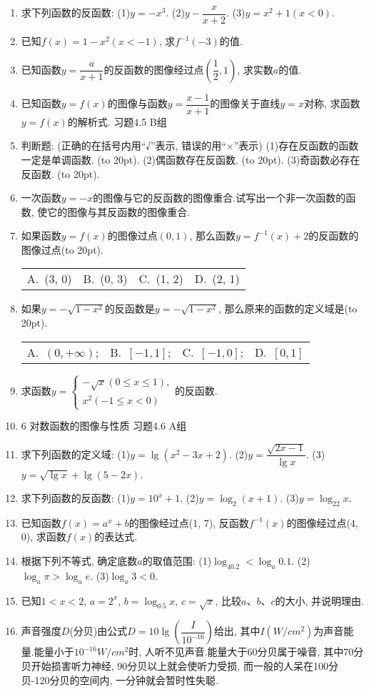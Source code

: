 \documentclass[10pt,a4paper]{article}
\newcommand{\bracket}[1]{(\hbox to #1pt{})}
\newcommand{\fourch}[4]{\par\begin{tabular}{p{.23\textwidth}p{.23\textwidth}p{.23\textwidth}p{.23\textwidth}}
A.~#1 &B.~#2& C.~#3& D.~#4
\end{tabular}}
\begin{document}
\begin{enumerate}[1.]
\item 求下列函数的反函数:
(1)$y=-x^3$.						(2)$y-\dfrac x{x+2}$.
(3)$y=x^2+1(x<0)$.
\item 已知$f(x)=1-x^2(x<-1)$, 求$f^{-1}(-3)$的值.
\item 已知函数$y=\dfrac a{x+1}$的反函数的图像经过点$(\dfrac 12,1)$, 求实数$a$的值.
\item 已知函数$y=f(x)$的图像与函数$y=\dfrac{x-1}{x+1}$的图像关于直线$y=x$对称, 求函数$y=f(x)$的解析式.
习题4.5  B组
\item 判断题: (正确的在括号内用``√''表示, 错误的用``×''表示)
(1)存在反函数的函数一定是单调函数.				\bracket{20}.
(2)偶函数存在反函数.							\bracket{20}.
(3)奇函数必存在反函数.							\bracket{20}.
\item 一次函数$y=-x$的图像与它的反函数的图像重合.试写出一个非一次函数的函数, 使它的图像与其反函数的图像重合.
\item 如果函数$y=f(x)$的图像过点$(0, 1)$, 那么函数$y=f^{-1}(x)+2$的反函数的图像过点\bracket{20}.
\fourch{(3, 0)}{(0, 3)}{(1, 2)}{(2, 1)}
\item 如果$y=-\sqrt {1-x^2}$的反函数是$y=-\sqrt {1-x^2}$, 那么原来的函数的定义域是\bracket{20}.
\fourch{$(0,+\infty)$;}{$[-1,1]$;}{$[-1,0]$;}{$[0,1]$}
\item 求函数$y=\begin{cases} -\sqrt x(0\le x\le 1), \\ x^2(-1\le x<0) \end{cases}$的反函数.
\item 6  对数函数的图像与性质
习题4.6  A组
\item 求下列函数的定义域:
(1)$y=\lg (x^2-3x+2)$.				(2)$y=\dfrac{\sqrt {2x-1}}{\lg x}$.
(3)$y=\sqrt {\lg x}+\lg (5-2x)$.
\item 求下列函数的反函数:
(1)$y=10^x+1$.						(2)$y=\log _2(x+1)$.
(3)$y=\log _22x$.
\item 已知函数$f(x)=a^x+b$的图像经过点(1, 7), 反函数$f^{-1}(x)$的图像经过点(4, 0), 求函数$f(x)$的表达式.
\item 根据下列不等式, 确定底数$a$的取值范围:
(1)$\log _40.2<\log _a0.1$.				(2)$\log _a\pi >\log _ae$.
(3)$\log _a3<0$.
\item 已知$1<x<2$, $a=2^x$, $b=\log _{0.5}x$, $c=\sqrt x$, 比较$a$、$b$、$c$的大小, 并说明理由.
\item 声音强度$D$(分贝)由公式$D=10\lg (\dfrac I{10^{-16}})$给出, 其中$I(W/cm^2)$为声音能量.能量小于$10^{-16}W/cm^2$时, 人听不见声音.能量大于60分贝属于噪音, 其中70分贝开始损害听力神经, 90分贝以上就会使听力受损, 而一般的人呆在100分贝-120分贝的空间内, 一分钟就会暂时性失聪.

\end{enumerate}
\end{document}
